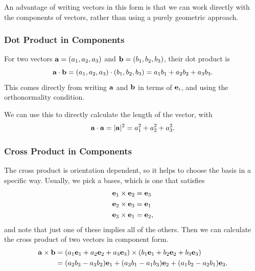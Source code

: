 \documentclass[a4paper]{scrartcl}
\begin{document}
An advantage of writing vectors in this form is that we can work directly with the components of vectors, rather than using a purely geometric approach.

\subsubsection{Dot Product in Components}

For two vectors $\mathbf{a} = (a_1, a_2, a_3)$ and $\mathbf{b} = (b_1, b_2, b_3)$, their dot product is
$$
\mathbf{a} \cdot \mathbf{b} = (a_1, a_2, a_3) \cdot (b_1, b_2, b_3) = a_1 b_1 + a_2 b_2 + a_3 b_3.
$$
This comes directly from writing $\mathbf{a}$ and $\mathbf{b}$ in terms of $\mathbf{e}_i$, and using the orthonormality condition.

We can use this to directly calculate the length of the vector,
with
$$
\mathbf{a}\cdot\mathbf{a} = |\mathbf{a}|^2 = a_1 ^2 + a_2 ^2 + a_3^2.
$$

\subsubsection{Cross Product in Components}

The cross product is orientation dependent, so it helps to choose the basis in a specific way. Usually, we pick a  bases, which is one that satisfies
\begin{align*}
    \mathbf{e}_1 \times \mathbf{e}_2 &= \mathbf{e}_3 \\
    \mathbf{e}_2 \times \mathbf{e}_3 &= \mathbf{e}_1 \\
    \mathbf{e}_3 \times \mathbf{e}_1 &= \mathbf{e}_2,
\end{align*} 
and note that just one of these implies all of the others.
Then we can calculate the cross product of two vectors in component form.
\begin{align*}
    \mathbf{a} \times \mathbf{b} &= (a_1 \mathbf{e}_1 + a_2 \mathbf{e}_2 + a_3 \mathbf{e}_3) \times (b_1 \mathbf{e}_1 + b_2 \mathbf{e}_2 + b_3 \mathbf{e}_3) \\
        &= (a_2 b_3 - a_3 b_2) \mathbf{e}_1 + (a_3 b_1 - a_1 b_3) \mathbf{e}_2 + (a_1 b_2 - a_2 b_1) \mathbf{e}_3.
\end{align*}
\end{document}
